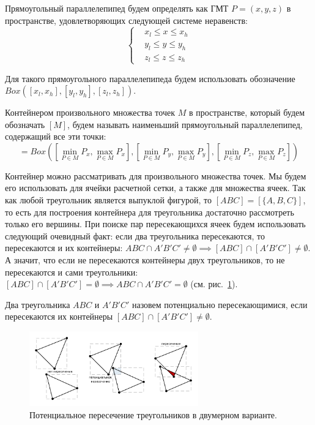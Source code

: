 Прямоугольный параллелепипед будем определять как ГМТ\label{abbr:gmt-4} $P = (x, y, z)$ в пространстве, удовлетворяющих следующей системе неравенств:
\begin{equation}\label{eqn:text_1_geo_prim_parallelepiped}
	\left\{
		\begin{aligned}
			& x_l \le x \le x_h \\
			& y_l \le y \le y_h \\
			& z_l \le z \le z_h
		\end{aligned}
	\right.
\end{equation}

Для такого прямоугольного параллелепипеда будем использовать обозначение $Box([x_l, x_h], [y_l, y_h], [z_l, z_h])$.

\begin{definition}
Контейнером произвольного множества точек $M$ в пространстве, который будем обозначать $[M]$, будем называть наименьший прямоугольный параллелепипед, содержащий все эти точки:
\begin{equation}
[M] = Box \left( \left[\min_{P \in M}{P_x}, \max_{P \in M}{P_x}\right],
                 \left[\min_{P \in M}{P_y}, \max_{P \in M}{P_y}\right],
                 \left[\min_{P \in M}{P_z}, \max_{P \in M}{P_z}\right] \right)
\end{equation}
\end{definition}

Контейнер можно рассматривать для произвольного множества точек.
Мы будем его использовать для ячейки расчетной сетки, а также для множества ячеек.
Так как любой треугольник является выпуклой фигурой, то $[ABC] = [\{A, B, C\}]$, то есть для построения контейнера для треугольника достаточно рассмотреть только его вершины.
При поиске пар пересекающихся ячеек будем использовать следующий очевидный факт: если два треугольника пересекаются, то пересекаются и их контейнеры: $ABC \cap A'B'C' \ne \emptyset \implies [ABC] \cap [A'B'C'] \ne \emptyset$.
А значит, что если не пересекаются контейнеры двух треугольников, то не пересекаются и сами треугольники: $[ABC] \cap [A'B'C'] = \emptyset \implies ABC \cap A'B'C' = \emptyset$ (см. рис.~\ref{fig:text_1_int_containers}).

\begin{definition}
Два треугольника $ABC$ и $A'B'C'$ назовем потенциально пересекающимися, если пересекаются их контейнеры $[ABC] \cap [A'B'C'] \ne \emptyset$.
\end{definition}

\begin{figure}[ht]
\centering
\includegraphics[width=0.65\textwidth]{fig/int_containers.pdf}
\singlespacing
{}\caption{Потенциальное пересечение треугольников в двумерном варианте.}\label{fig:text_1_int_containers}
\end{figure}

